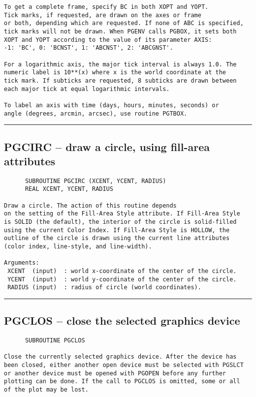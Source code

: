 {\begin{verbatim}
To get a complete frame, specify BC in both XOPT and YOPT.
Tick marks, if requested, are drawn on the axes or frame
or both, depending which are requested. If none of ABC is specified,
tick marks will not be drawn. When PGENV calls PGBOX, it sets both
XOPT and YOPT according to the value of its parameter AXIS:
-1: 'BC', 0: 'BCNST', 1: 'ABCNST', 2: 'ABCGNST'.

For a logarithmic axis, the major tick interval is always 1.0. The
numeric label is 10**(x) where x is the world coordinate at the
tick mark. If subticks are requested, 8 subticks are drawn between
each major tick at equal logarithmic intervals.

To label an axis with time (days, hours, minutes, seconds) or
angle (degrees, arcmin, arcsec), use routine PGTBOX.
\end{verbatim}
\hrule


\subsection*{PGCIRC -- draw a circle, using fill-area attributes }
\begin{verbatim}
      SUBROUTINE PGCIRC (XCENT, YCENT, RADIUS)
      REAL XCENT, YCENT, RADIUS

Draw a circle. The action of this routine depends
on the setting of the Fill-Area Style attribute. If Fill-Area Style
is SOLID (the default), the interior of the circle is solid-filled
using the current Color Index. If Fill-Area Style is HOLLOW, the
outline of the circle is drawn using the current line attributes
(color index, line-style, and line-width).

Arguments:
 XCENT  (input)  : world x-coordinate of the center of the circle.
 YCENT  (input)  : world y-coordinate of the center of the circle.
 RADIUS (input)  : radius of circle (world coordinates).
\end{verbatim}
\hrule


\subsection*{PGCLOS -- close the selected graphics device }
\begin{verbatim}
      SUBROUTINE PGCLOS

Close the currently selected graphics device. After the device has
been closed, either another open device must be selected with PGSLCT
or another device must be opened with PGOPEN before any further
plotting can be done. If the call to PGCLOS is omitted, some or all 
of the plot may be lost.


\end{verbatim}}
